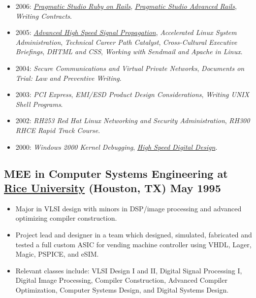 \documentclass[10pt,letterpaper,oneside]{report}
\begin{document}
\begin{itemize}
  \item 2006:
    \href{http://pragmaticstudio.com/rails/}{\textit{Pragmatic Studio Ruby on Rails}},
    \href{http://pragmaticstudio.com/rails-ii}{\textit{Pragmatic Studio Advanced Rails}},
    \textit{Writing Contracts}.

  \item 2005:
    \href{http://www.sigcon.com/Pubs/HSSPsem.html}
      {\textit{Advanced High Speed Signal Propagation}},
    \textit{Accelerated Linux System Administration},
    \textit{Technical Career Path Catalyst},
    \textit{Cross-Cultural Executive Briefings},
    \textit{DHTML and CSS},
    \textit{Working with Sendmail and Apache in Linux}.

  \item 2004:
    \textit{Secure Communications and Virtual Private Networks},
    \textit{Documents on Trial: Law and Preventive Writing}.

  \item 2003:
    \textit{PCI Express},
    \textit{EMI/ESD Product Design Considerations},
    \textit{Writing UNIX Shell Programs}.

  \item 2002:
    \textit{RH253 Red Hat Linux Networking and Security Administration},
    \textit{RH300 RHCE Rapid Track Course}.

  \item 2000:
    \textit{Windows 2000 Kernel Debugging},
    \href{http://www.sigcon.com/Pubs/HSDDsem.htm}
      {\textit{High Speed Digital Design}}.
\end{itemize}

\medskip

\begin{minipage}{\textwidth}
  \subsection[MEE in Computer Systems Engineering]{
    MEE in Computer Systems Engineering at
    \href{http://www.ece.rice.edu/}{Rice University}
    {\small (Houston, TX)} \hfill May 1995
  }

  \begin{itemize}
    \item Major in VLSI design with minors in DSP/image processing and advanced
      optimizing compiler construction.

    \item Project lead and designer in a team which designed, simulated,
      fabricated and tested a full custom ASIC for vending machine controller
      using VHDL, Lager, Magic, PSPICE, and eSIM.

    \item Relevant classes include: VLSI Design I and II, Digital Signal
      Processing I, Digital Image Processing, Compiler Construction, Advanced
      Compiler Optimization, Computer Systems Design, and Digital Systems
      Design.
  \end{itemize}
\end{minipage}
\end{document}
